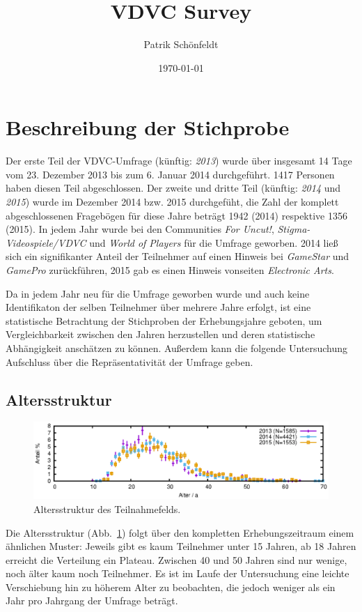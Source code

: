 \documentclass[11pt]{scrartcl}
\title{VDVC Survey}
\author{Patrik Schönfeldt}
\date{\today}
\begin{document}
\maketitle

\section{Beschreibung der Stichprobe}
Der erste Teil der VDVC-Umfrage (künftig: \emph{2013}) wurde über insgesamt 14 Tage
vom 23. Dezember 2013 bis zum 6. Januar 2014 durchgeführt.
1417 Personen haben diesen Teil abgeschlossen.
Der zweite und dritte Teil (künftig: \emph{2014} und \emph{2015})
wurde im Dezember 2014 bzw. 2015 durchgefüht,
die Zahl der komplett abgeschlossenen Fragebögen für diese Jahre beträgt 
1942 (2014) respektive 1356 (2015).
In jedem Jahr wurde bei den Communities \emph{For Uncut!},
\emph{Stigma-Videospiele/VDVC} und \emph{World of Players} für die Umfrage
geworben.
2014 ließ sich ein signifikanter Anteil der Teilnehmer auf einen
Hinweis bei \emph{GameStar} und \emph{GamePro} zurückführen,
2015 gab es einen Hinweis vonseiten \emph{Electronic Arts}.

Da in jedem Jahr neu für die Umfrage geworben wurde und auch keine
Identifikaton der selben Teilnehmer über mehrere Jahre erfolgt,
ist eine statistische Betrachtung der Stichproben der Erhebungsjahre
geboten,
um Vergleichbarkeit zwischen den Jahren herzustellen und deren
statistische Abhängigkeit anschätzen zu können.
Außerdem kann die folgende Untersuchung
Aufschluss über die Repräsentativität der Umfrage geben.


\subsection{Altersstruktur}

\begin{figure}[htbp]
	\centering
	\includegraphics[width=15cm]{vgl/alter}
	\caption[Altersstruktur]
	{Altersstruktur des Teilnahmefelds.}
	\label{fig:alter}
\end{figure}

Die Altersstruktur (Abb.~\ref{fig:alter}) folgt über
den kompletten Erhebungszeitraum einem	ähnlichen Muster:
Jeweils gibt es kaum Teilnehmer unter 15 Jahren,
ab 18 Jahren erreicht die Verteilung ein Plateau.
Zwischen 40 und 50 Jahren sind nur wenige, noch älter kaum noch Teilnehmer.
Es ist im Laufe der Untersuchung eine leichte Verschiebung hin zu höherem
Alter zu beobachten, die jedoch weniger als ein Jahr pro Jahrgang der Umfrage
beträgt.
\end{document}
